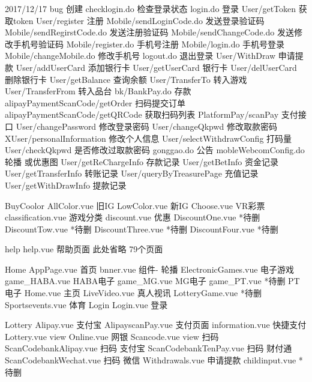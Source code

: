 2017/12/17 bug  创建
checklogin.do                   检查登录状态
login.do                        登录
User/getToken                   获取token
User/register                   注册
Mobile/sendLoginCode.do         发送登录验证码
Mobile/sendRegirstCode.do       发送注册验证码
Mobile/sendChangeCode.do        发送修改手机号验证码
Mobile/register.do              手机号注册
Mobile/login.do                 手机号登录
Mobile/changeMobile.do          修改手机号
logout.do                       退出登录
User/WithDraw                   申请提款
User/addUserCard                添加银行卡
User/getUserCard                银行卡
User/delUserCard                删除银行卡
User/getBalance                 查询余额
User/TransferTo                 转入游戏
User/TransferFrom               转入品台
bk/BankPay.do                   存款
alipayPaymentScanCode/getOrder  扫码提交订单
alipayPaymentScanCode/getQRCode 获取扫码列表
PlatformPay/scanPay             支付接口
User/changePassword             修改登录密码
User/changeQkpwd                修改取款密码
XUser/personalInformation       修改个人信息
User/selectWithdrawConfig       打码量
User/checkQkpwd                 是否修改过取款密码
gonggao.do                      公告
mobleWebcomConfig.do            轮播 或优惠图
User/getReChargeInfo            存款记录
User/getBetInfo                 资金记录
User/getTransferInfo            转账记录
User/queryByTreasurePage        充值记录
User/getWithDrawInfo            提款记录

BuyCoolor
    AllColor.vue                旧IG
    LowColor.vue                新IG
    Choose.vue                  VR彩票
    classification.vue          游戏分类
    discount.vue                优惠
    DiscountOne.vue             *待删
    DiscountTow.vue             *待删
    DiscountThree.vue           *待删
    DiscountFour.vue            *待删

help
    help.vue                    帮助页面
                                此处省略 79个页面

Home
    AppPage.vue                 首页
    bnner.vue                   组件- 轮播
    ElectronicGames.vue         电子游戏
    game_HABA.vue               HABA电子
    game_MG.vue                 MG电子
    game_PT.vue                 *待删 PT电子
    Home.vue                    主页
    LiveVideo.vue               真人视讯
    LotteryGame.vue             *待删
    Sportsevents.vue            体育
Login
    Login.vue                   登录

Lottery
    Alipay.vue                  支付宝
    AlipayscanPay.vue           支付页面
    information.vue             快捷支付
    Lottery.vue                 view
    Online.vue                  网银
    Scancode.vue                view    扫码
    ScanCodebankAlipay.vue      扫码 支付宝
    ScanCodebankTenPay.vue      扫码 财付通
    ScanCodebankWechat.vue      扫码 微信
    Withdrawals.vue             申请提款
    childinput.vue              *待删

